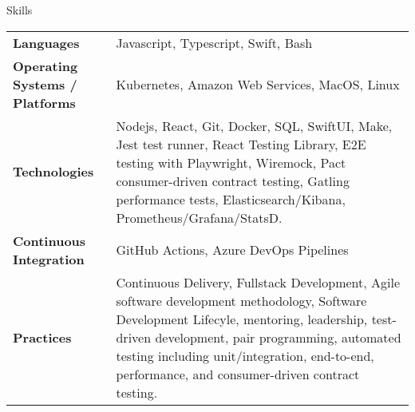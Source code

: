 \begin{section}{Skills}
  \begin{tabularx}{\linewidth}{@{}l X@{}}
    \textbf{Languages} &\small{Javascript, Typescript, Swift, Bash} \\
    \textbf{Operating Systems / Platforms} &\small{Kubernetes, Amazon Web Services, MacOS, Linux} \\
    \textbf{Technologies} &\small{Nodejs, React, Git, Docker, SQL, SwiftUI, Make, Jest test runner, React Testing Library, E2E testing with Playwright, Wiremock, Pact consumer-driven contract testing, Gatling performance tests, Elasticsearch/Kibana, Prometheus/Grafana/StatsD.} \\
    \textbf{Continuous Integration} &\small{GitHub Actions, Azure DevOps Pipelines} \\
    \textbf{Practices} &\small{Continuous Delivery, Fullstack Development, Agile software development methodology, Software Development Lifecyle, mentoring, leadership, test-driven development, pair programming, automated testing including unit/integration, end-to-end, performance, and consumer-driven contract testing.} \\
  \end{tabularx}
\end{section}
